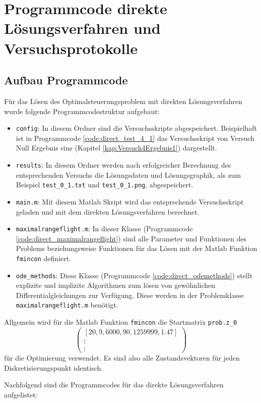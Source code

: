 \chapter{Programmcode direkte Lösungsverfahren und Versuchsprotokolle}

\section{Aufbau Programmcode}
Für das Lösen des Optimalsteuerungsproblem mit direkten Lösungsverfahren wurde folgende Programmcodestruktur aufgebaut:
\begin{itemize}
\item \texttt{config}: In diesem Ordner sind die Versuchsskripte abgespeichert. Beispielhaft ist in Programmcode \ref{code:direct_test_4_1} das Versuchsskript von Versuch Null Ergebnis eins (Kapitel \ref{kap:Versuch4Ergebnis1}) dargestellt.
%
\item \texttt{results}: In diesem Ordner werden nach erfolgreicher Berechnung des entsprechenden Versuchs die Lösungsdaten und Lösungsgraphik, als zum Beispiel \texttt{test\_0\_1.txt} und \texttt{test\_0\_1.png}, abgespeichert.
\item \texttt{main.m}: Mit diesem Matlab Skript wird das entsprechende Versuchsskript geladen und mit dem direkten Lösungsverfahren berechnet.
%
\item \texttt{maximalrangeflight.m}: In dieser Klasse (Programmcode \ref{code:direct_maximalrangeflight}) sind alle Parameter und Funktionen des Problems beziehungsweise Funktionen für das Lösen mit der Matlab Funktion \texttt{fmincon} definiert. 
%
\item \texttt{ode\_methods}: Diese Klasse (Programmcode \ref{code:direct_odemethods}) stellt explizite und implizite Algorithmen zum lösen von gewöhnlichen Differentialgleichungen zur Verfügung. Diese werden in der Problemklasse \texttt{maximalrangeflight.m} benötigt.
\end{itemize}

Allgemein wird für die Matlab Funktion \verb|fmincon| die Startmatrix  \verb|prob.z_0| 
\[\begin{pmatrix}
[20,9,6000,90,1259999,1.47] \\ 
\vdots \\ 
\vdots
\end{pmatrix}\]
für die Optimierung verwendet. Es sind also alle Zustandsvektoren für jeden Diskretisierungspunkt identisch.

Nachfolgend sind die Programmcodes für das direkte Lösungsverfahren aufgelistet:

